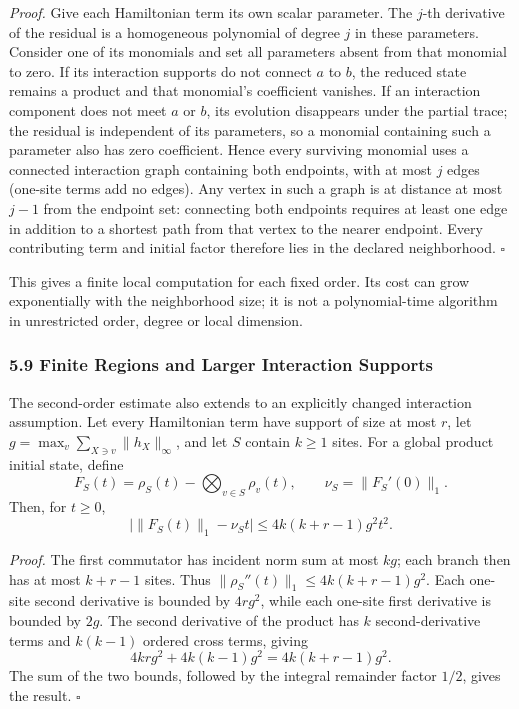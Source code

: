 \documentclass[
  11pt,
]{article}
\begin{document}
\emph{Proof.} Give each Hamiltonian term its own scalar parameter. The
\(j\)-th derivative of the residual is a homogeneous polynomial of degree
\(j\) in these parameters. Consider one of its monomials and set all
parameters absent from that monomial to zero. If its interaction supports
do not connect \(a\) to \(b\), the reduced state remains a product and
that monomial's coefficient vanishes. If an interaction component does
not meet \(a\) or \(b\), its evolution disappears under the partial trace;
the residual is independent of its parameters, so a monomial containing
such a parameter also has zero coefficient. Hence every surviving
monomial uses a connected interaction graph containing both endpoints,
with at most \(j\) edges (one-site terms add no edges). Any vertex in such
a graph is at distance at most \(j-1\) from the endpoint set: connecting
both endpoints requires at least one edge in addition to a shortest path
from that vertex to the nearer endpoint. Every contributing term and
initial factor therefore lies in the declared neighborhood. \(\square\)

This gives a finite local computation for each fixed order. Its cost can
grow exponentially with the neighborhood size; it is not a polynomial-time
algorithm in unrestricted order, degree or local dimension.

\subsubsection{5.9 Finite Regions and Larger Interaction Supports}\label{finite-regions-and-larger-interaction-supports}

The second-order estimate also extends to an explicitly changed interaction
assumption. Let every Hamiltonian term have support of size at most \(r\),
let \(g=\max_v\sum_{X\ni v}\lVert h_X\rVert_\infty\), and let \(S\) contain \(k\geq1\)
sites. For a global product initial state, define
\[
 F_S(t)=\rho_S(t)-\bigotimes_{v\in S}\rho_v(t),\qquad
 \nu_S=\lVert F_S'(0)\rVert_1.
\]
Then, for \(t\geq0\),
\[
 \boxed{\ \bigl|\lVert F_S(t)\rVert_1-\nu_S t\bigr|
 \leq4k(k+r-1)g^2t^2.\ }
\]

\emph{Proof.} The first commutator has incident norm sum at most \(kg\);
each branch then has at most \(k+r-1\) sites. Thus
\(\lVert \rho_S''(t)\rVert_1\leq4k(k+r-1)g^2\).
Each one-site second derivative is bounded by \(4rg^2\), while each
one-site first derivative is bounded by \(2g\). The second derivative of
the product has \(k\) second-derivative terms and \(k(k-1)\) ordered
cross terms, giving
\[
 4krg^2+4k(k-1)g^2=4k(k+r-1)g^2.
\]
The sum of the two bounds, followed by the integral remainder factor
\(1/2\), gives the result. \(\square\)
\end{document}
